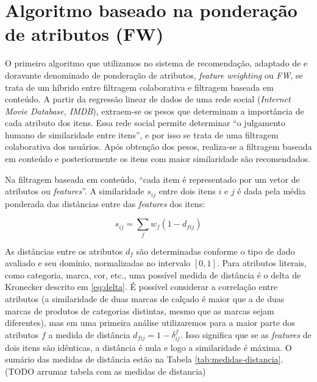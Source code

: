 \section{Algoritmo baseado na ponderação de atributos (FW)} %
\label{sec:algoritmo_baseado_na_pondera_o_de_atributos_}


O primeiro algoritmo que utilizamos no sistema de recomendação, adaptado de  \cite{symeonidis2007feature} e doravante denominado de ponderação de atributos, \textit{feature weighting} ou \textit{FW}, se trata de um híbrido entre filtragem colaborativa e filtragem baseada em conteúdo. A partir da regressão linear de dados de uma rede social (\textit{Internet Movie Database, IMDB}), extraem-se os pesos que determinam a importância de cada atributo dos itens. Essa rede social permite determinar ``o julgamento humano de similaridade entre itens'', e por isso se trata de uma filtragem colaborativa dos usuários. Após obtenção dos pesos, realiza-se a filtragem baseada em conteúdo e posteriormente os itens com maior similaridade são recomendados.

Na filtragem baseada em conteúdo, ``cada item é representado por um vetor de atributos ou \textit{features}''. A similaridade $s_{ij}$ entre dois itens $i$ e $j$ é dada pela média ponderada das distâncias entre das \textit{features} dos itens:

\begin{equation} 
\label{eq:similaridade}
    s_{ij} = \sum_{f}{w_{f} \left(1-d_{fij}\right)}
\end{equation}

As distâncias entre os atributos $d_f$ são determinadas conforme o tipo de dado avaliado e seu domínio, normalizadas no intervalo $\left[0,1\right]$. Para atributos literais, como categoria, marca, cor, etc., uma possível medida de distância é o delta de Kronecker descrito em \ref{eq:delta}. É possível considerar a correlação entre atributos (a similaridade de duas marcas de calçado é maior que a de duas marcas de produtos de categorias distintas, mesmo que as marcas sejam diferentes), mas em uma primeira análise utilizaremos para a maior parte dos atributos $f$ a medida de distância $d_{fij}=1-\delta_{ij}^f$. Isso significa que se as \textit{features} de dois itens são idênticas, a distância é nula e logo a similaridade é máxima. O sumário das medidas de distância estão na Tabela \ref{tab:medidas-distancia}. (TODO arrumar tabela com as medidas de distancia)

